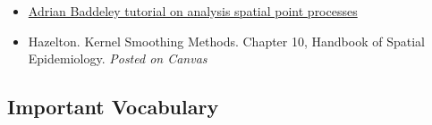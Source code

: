 \documentclass[
]{book}
\providecommand{\tightlist}{%
  \setlength{\itemsep}{0pt}\setlength{\parskip}{0pt}}
\begin{document}
\begin{itemize}
\tightlist
\item
  \href{https://training.fws.gov/courses/references/tutorials/geospatial/CSP7304/documents/PointPatterTutorial.pdf}{Adrian Baddeley tutorial on analysis spatial point processes}
\item
  Hazelton. Kernel Smoothing Methods. Chapter 10, Handbook of Spatial Epidemiology. \emph{Posted on Canvas}
\end{itemize}

\hypertarget{important-vocabulary-6}{%
\subsection{Important Vocabulary}\label{important-vocabulary-6}}

 
  \providecommand{\huxb}[2]{\arrayrulecolor[RGB]{#1}\global\arrayrulewidth=#2pt}
  \providecommand{\huxvb}[2]{\color[RGB]{#1}\vrule width #2pt}
  \providecommand{\huxtpad}[1]{\rule{0pt}{#1}}
  \providecommand{\huxbpad}[1]{\rule[-#1]{0pt}{#1}}
\end{document}
